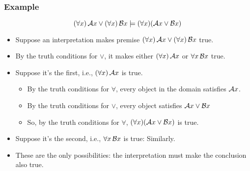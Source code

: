 \begin{frame}
  \frametitle{Example}

  \[(\forall x)\,\mathcal{A}x \vee (\forall x)\,\mathcal{B}x \models (\forall x)(\mathcal{A}x \vee \mathcal{B}x)\]
  \begin{itemize}[<+->]
  \item Suppose an interpretation makes premise $(\forall x)\,\mathcal{A}x
  \vee (\forall x)\,\mathcal{B}x$ true.
  \item By the truth conditions for $\lor$, it makes either $(\forall x)\,\mathcal{A}x$ or $\forall
  x\,\mathcal{B}x$ true.
  \item Suppose it's the first, i.e., $(\forall x)\,\mathcal{A}x$ is true.
    \begin{itemize}[<+->]
      \item By the truth conditions for $\forall$, every object in the domain satisfies $\mathcal{A}x$.
      \item By the truth conditions for $\lor$, every object satisfies $\mathcal{A}x \vee \mathcal{B}x$
      \item So, by the truth conditions for $\forall$, $(\forall x)(\mathcal{A}x
      \vee \mathcal{B}x)$ is true.
    \end{itemize}
  \item Suppose it's the second, i.e., $\forall
  x\,\mathcal{B}x$ is true: Similarly.
  \item These are the only possibilities: the interpretation must make the conclusion also true.
  \end{itemize}
\end{frame}
